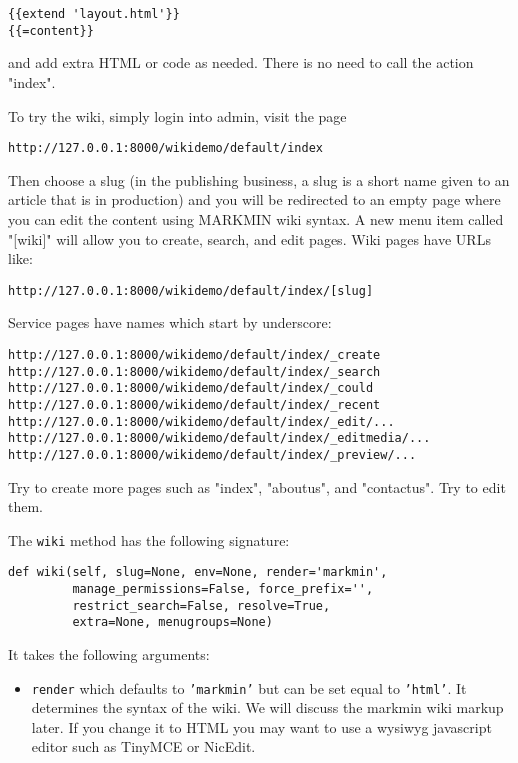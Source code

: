 \documentclass[justified,sixbynine,notoc]{tufte-book}
\def\ft{\small\tt}
\begin{document}
\begin{fullwidth}
\begin{lstlisting}[keywords={}]
{{extend 'layout.html'}}
{{=content}}
\end{lstlisting}
\noindent and add extra HTML or code as needed. There is no need to call the action "index".

To try the wiki, simply login into admin, visit the page

\begin{lstlisting}[keywords={}]
http://127.0.0.1:8000/wikidemo/default/index
\end{lstlisting}

Then choose a slug (in the publishing business, a slug is a short name given to an article that is in production) and you will be redirected to an empty page where you can edit the content using MARKMIN wiki syntax. A new menu item called "[wiki]" will allow you to create, search, and edit pages. Wiki pages have URLs like:

\begin{lstlisting}[keywords={}]
http://127.0.0.1:8000/wikidemo/default/index/[slug]
\end{lstlisting}

Service pages have names which start by underscore:

\begin{lstlisting}[keywords={}]
http://127.0.0.1:8000/wikidemo/default/index/_create
http://127.0.0.1:8000/wikidemo/default/index/_search
http://127.0.0.1:8000/wikidemo/default/index/_could
http://127.0.0.1:8000/wikidemo/default/index/_recent
http://127.0.0.1:8000/wikidemo/default/index/_edit/...
http://127.0.0.1:8000/wikidemo/default/index/_editmedia/...
http://127.0.0.1:8000/wikidemo/default/index/_preview/...
\end{lstlisting}

Try to create more pages such as "index", "aboutus", and "contactus".
Try to edit them.

The {\ft wiki} method has the following signature:

\begin{lstlisting}
def wiki(self, slug=None, env=None, render='markmin',
         manage_permissions=False, force_prefix='',
         restrict_search=False, resolve=True,
         extra=None, menugroups=None)
\end{lstlisting}

It takes the following arguments:

\begin{itemize}
\item {\ft render} which defaults to {\ft 'markmin'} but can be set equal to {\ft 'html'}. It determines the syntax of the wiki. We will discuss the markmin wiki markup later. If you change it to HTML you may want to use a wysiwyg javascript editor such as TinyMCE or NicEdit.


\end{itemize}
\end{fullwidth}
\end{document}
